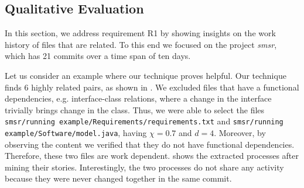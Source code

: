 \subsection{Qualitative Evaluation}
\label{subsec:qualitative-eval}

In this section, we address requirement R1 by showing insights on the work history of files that are related. To this end we focused on the project \emph{smsr}, which has 21 commits over a time span of ten days.

Let us consider an example where our technique proves helpful. Our technique finds 6 highly related pairs, as shown in . We excluded files that have a functional dependencies, e.g. interface-class relations, where a change in the interface trivially brings change in the class. Thus, we were able to select the files \texttt{smsr/running example/Requirements/requirements.txt} and \texttt{smsr/running example/Software/model.java}, having $\chi=0.7$ and $d=4$. Moreover, by observing the content we verified that they do not have functional dependencies. Therefore, these two files are work dependent.
 shows the extracted processes after mining their stories. Interestingly, the two processes do not share any activity because they were never changed together in the same commit.


